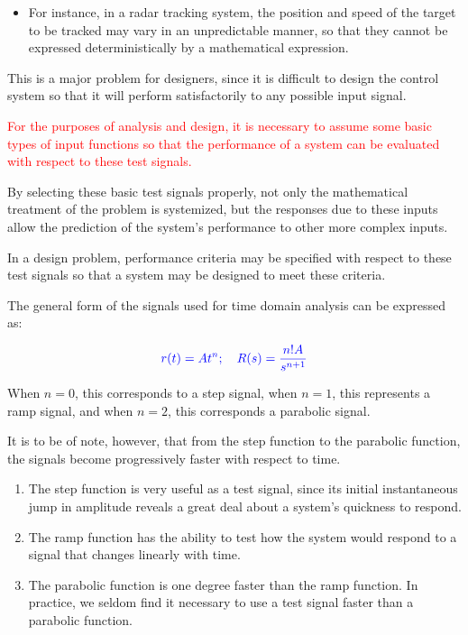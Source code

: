 \documentclass[
  14pt,
  a4paper,
  oneside,
  open=any,
  a4paper,
  14pt]{report}
\providecommand{\tightlist}{%
  \setlength{\itemsep}{0pt}\setlength{\parskip}{0pt}}\usepackage{longtable,booktabs,array}
\begin{document}
\begin{itemize}
\tightlist
\item
  For instance, in a radar tracking system, the position and speed of
  the target to be tracked may vary in an unpredictable manner, so that
  they cannot be expressed deterministically by a mathematical
  expression.
\end{itemize}

This is a major problem for designers, since it is difficult to design
the control system so that it will perform satisfactorily to any
possible input signal.

\textcolor{red}{For the purposes of analysis and design, it is necessary
to assume some basic types of input functions so that the performance of
a system can be evaluated with respect to these test signals.}

By selecting these basic test signals properly, not only the
mathematical treatment of the problem is systemized, but the responses
due to these inputs allow the prediction of the system's performance to
other more complex inputs.

In a design problem, performance criteria may be specified with respect
to these test signals so that a system may be designed to meet these
criteria.

The general form of the signals used for time domain analysis can be
expressed as:

\[
    \textcolor{blue}{r(t) = At^n; \quad R(s) = \dfrac{n!A}{s^{n+1}}}
\]

When \(n=0\), this corresponds to a step signal, when \(n=1\), this
represents a ramp signal, and when \(n=2\), this corresponds a parabolic
signal.

It is to be of note, however, that from the step function to the
parabolic function, the signals become progressively faster with respect
to time.

\begin{enumerate}
\def\labelenumi{\arabic{enumi}.}
\item
  The step function is very useful as a test signal, since its initial
  instantaneous jump in amplitude reveals a great deal about a system's
  quickness to respond.
\item
  The ramp function has the ability to test how the system would respond
  to a signal that changes linearly with time.
\item
  The parabolic function is one degree faster than the ramp function. In
  practice, we seldom find it necessary to use a test signal faster than
  a parabolic function.
\end{enumerate}
\end{document}
